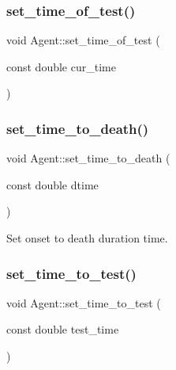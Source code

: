 \mbox{\label{classAgent_aef9c72b5c984f9c89df6f8e1a0ad166d}} 
\subsubsection{\texorpdfstring{set\+\_\+time\+\_\+of\+\_\+test()}{set\_time\_of\_test()}}
{\footnotesize\ttfamily void Agent\+::set\+\_\+time\+\_\+of\+\_\+test (\begin{DoxyParamCaption}\item[{const double}]{cur\+\_\+time }\end{DoxyParamCaption})\hspace{0.3cm}{\ttfamily [inline]}}

\mbox{\label{classAgent_aac1043948af7c46b29e2cc9e4e2d89ab}} 
\subsubsection{\texorpdfstring{set\+\_\+time\+\_\+to\+\_\+death()}{set\_time\_to\_death()}}
{\footnotesize\ttfamily void Agent\+::set\+\_\+time\+\_\+to\+\_\+death (\begin{DoxyParamCaption}\item[{const double}]{dtime }\end{DoxyParamCaption})\hspace{0.3cm}{\ttfamily [inline]}}



Set onset to death duration time. 

\mbox{\label{classAgent_acedabbad82e3e566d07cb0f4a743db12}} 
\subsubsection{\texorpdfstring{set\+\_\+time\+\_\+to\+\_\+test()}{set\_time\_to\_test()}}
{\footnotesize\ttfamily void Agent\+::set\+\_\+time\+\_\+to\+\_\+test (\begin{DoxyParamCaption}\item[{const double}]{test\+\_\+time }\end{DoxyParamCaption})\hspace{0.3cm}{\ttfamily [inline]}}

